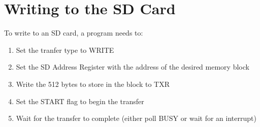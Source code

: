 \section{Writing to the SD Card}
To write to an SD card, a program needs to:
\begin{enumerate}
    \item Set the tranfer type to WRITE
    \item Set the SD Address Register with the address of the desired memory block
    \item Write the 512 bytes to store in the block to TXR
    \item Set the START flag to begin the transfer
    \item Wait for the transfer to complete (either poll BUSY or wait for an interrupt)
\end{enumerate}

